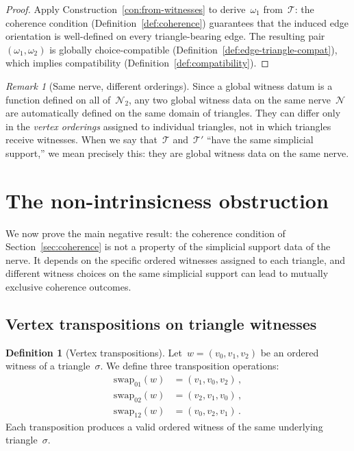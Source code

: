 \documentclass[11pt,a4paper]{article}
\theoremstyle{plain}
\theoremstyle{definition}
\newtheorem{definition}[theorem]{Definition}
\theoremstyle{remark}
\newtheorem{remark}[theorem]{Remark}
\newcommand{\cN}{\mathcal{N}}
\newcommand{\cT}{\mathcal{T}}
\newcommand{\swapAB}{\mathrm{swap}_{01}}
\newcommand{\swapAC}{\mathrm{swap}_{02}}
\newcommand{\swapBC}{\mathrm{swap}_{12}}
\begin{document}
\begin{proof}
Apply Construction~\ref{con:from-witnesses} to derive~$\omega_1$
from~$\cT$: the coherence condition (Definition~\ref{def:coherence})
guarantees that the induced edge orientation is well-defined on every
triangle-bearing edge. The resulting pair~$(\omega_1, \omega_2)$ is
globally choice-compatible (Definition~\ref{def:edge-triangle-compat}),
which implies compatibility (Definition~\ref{def:compatibility}).
\end{proof}

\begin{remark}[Same nerve, different orderings]
\label{rem:same-support}
Since a global witness datum is a function defined on all
of~$\cN_2$, any two global witness data on the same nerve~$\cN$
are automatically defined on the same domain of triangles.
They can differ only in the \emph{vertex orderings} assigned to
individual triangles, not in which triangles receive witnesses.
When we say that~$\cT$ and~$\cT'$ ``have the same simplicial
support,'' we mean precisely this: they are global witness data
on the same nerve.
\end{remark}

\section{The non-intrinsicness obstruction}
\label{sec:obstruction}

We now prove the main negative result: the coherence condition of
Section~\ref{sec:coherence} is not a property of the simplicial support
data of the nerve. It depends on the specific ordered witnesses assigned
to each triangle, and different witness choices on the same simplicial
support can lead to mutually exclusive coherence outcomes.

\subsection{Vertex transpositions on triangle witnesses}
\label{sec:swaps}

\begin{definition}[Vertex transpositions]
\label{def:swaps}
Let~$w = (v_0, v_1, v_2)$ be an ordered witness of a triangle~$\sigma$.
We define three transposition operations:
\begin{align}
  \swapAB(w) &= (v_1, v_0, v_2)\,, \label{eq:swapAB} \\
  \swapAC(w) &= (v_2, v_1, v_0)\,, \label{eq:swapAC} \\
  \swapBC(w) &= (v_0, v_2, v_1)\,. \label{eq:swapBC}
\end{align}
Each transposition produces a valid ordered witness of the same
underlying triangle~$\sigma$.
\end{definition}
\end{document}
